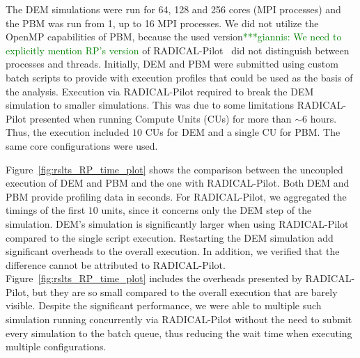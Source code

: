 \documentclass[preprint,11pt,authoryear]{elsarticle}
\newcommand{\gpnote}[1]{{\textcolor{green} {***giannis: #1}}}
\newcommand{\gpnote}[1]{}
\begin{document}
The DEM simulations were run for 64, 128 and 256 cores (MPI processes) and the PBM was
run from 1, up to 16 MPI processes. We did not utilize the OpenMP capabilities of PBM,
because the used version\gpnote{We need to explicitly mention RP's version} of RADICAL-Pilot~\cite{rp-jsspp18} did not distinguish between 
processes and threads. Initially, DEM and PBM were submitted using custom batch scripts
to provide with execution profiles that could be used as the basis of the analysis. 
Execution via RADICAL-Pilot required to break the DEM simulation to smaller
simulations. This was due to some limitations RADICAL-Pilot presented when running
Compute Units (CUs) for more than $\sim6$ hours. Thus, the execution included $10$ CUs
for DEM and a single CU for PBM. The same core configurations were used.

Figure~\ref{fig:rslts_RP_time_plot} shows the comparison between the uncoupled execution
of DEM and PBM and the one with RADICAL-Pilot. Both DEM and PBM provide profiling data in 
seconds. For RADICAL-Pilot, we aggregated the timings of the first $10$ units, since it
concerns only the DEM step of the simulation. DEM's simulation is significantly larger
when using RADICAL-Pilot compared to the single script execution. Restarting the DEM
simulation add significant overheads to the overall execution. In addition, we verified
that the difference cannot be attributed to RADICAL-Pilot. Figure~\ref{fig:rslts_RP_time_plot}
includes the overheads presented by RADICAL-Pilot, but they are so small compared to
the overall execution that are barely visible. Despite the significant performance,
we were able to multiple such simulation running concurrently via RADICAL-Pilot
without the need to submit every simulation to the batch queue, thus reducing
the wait time when executing multiple configurations.
\end{document}
